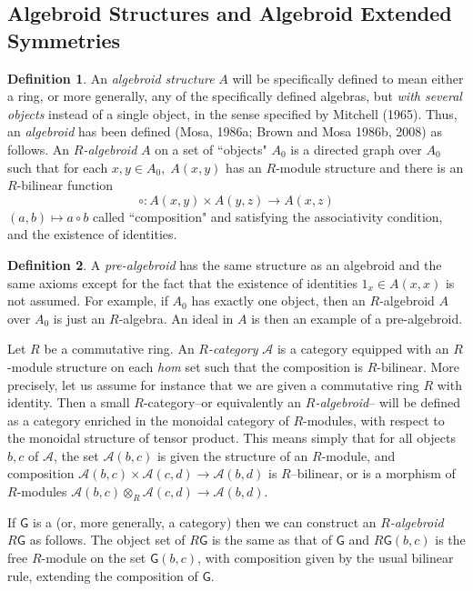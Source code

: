 \documentclass[12pt]{article}
\theoremstyle{plain}
\theoremstyle{definition}
\newtheorem{definition}{Definition}[section]
\numberwithin{equation}{section}
\newcommand{\A}{\mathcal A}
\newcommand{\lra}{{\longrightarrow}}
\newcommand{\<}{{\langle}}
\begin{document}
\subsection{Algebroid Structures and Algebroid Extended Symmetries}
 
\begin{definition}
An \emph{algebroid structure} $A$ will be specifically defined to mean
either a ring, or more generally, any of the specifically defined algebras, but \emph{with several
objects} instead of a single object, in the sense specified by Mitchell
(1965). Thus, an {\em algebroid}  has been defined (Mosa, 1986a; Brown and Mosa 1986b, 2008)
as follows.  An \textit{$R$-algebroid } $A$ on a set of ``objects" $A_0$
is a directed graph over $A_0$ such that for each $x,y \in A_0,\;
A(x,y)$ has an $R$-module structure and there is an $R$-bilinear
function $$ \circ : A(x,y) \times A(y,z) \to  A(x,z)$$ $(a , b)
\mapsto  a\circ b$ called ``composition" and satisfying the
associativity condition, and the existence of identities. 
\end{definition}


\begin{definition}
A {\em pre-algebroid} has the same structure as an algebroid and the same
axioms except for the fact that the existence of identities  $1_x \in A(x,x)$
is not assumed. For example, if $A_0$ has exactly one object, then
an $R$-algebroid $A$ over $A_0$ is just an $R$-algebra. An ideal
in $A$ is then an example of a pre-algebroid. 
\end{definition}

 Let $R$ be a commutative ring. An \textit{$R$-category }$\A$ is a category equipped with an $R$-module structure on each \textit{hom} set such that the composition is $R$-bilinear. More precisely, let us assume for instance that we are given a commutative ring $R$ with identity. Then a small $R$-category--or equivalently an \emph{$R$-algebroid}-- will be defined as a category enriched in the monoidal category of $R$-modules, with respect to the
monoidal structure of tensor product. This means simply that for all objects $b,c$ of $\A$, the set $\A(b,c)$ is given the structure of an $R$-module, and composition $\A(b,c) \times \A(c,d) \lra
\A(b,d)$ is $R$--bilinear, or is a morphism of $R$-modules $\A(b,c) \otimes_R \A(c,d) \lra \A(b,d)$.

 If $\mathsf{G}$ is a  (or, more generally, a category)
then we can construct an \emph{$R$-algebroid} $R\mathsf{G}$ as
follows. The object set of $R\mathsf{G}$ is the same as that of
$\mathsf{G}$ and $R\mathsf{G}(b,c)$ is the free $R$-module on the
set $\mathsf{G}(b,c)$, with composition given by the usual
bilinear rule, extending the composition of $\mathsf{G}$.
\end{document}
